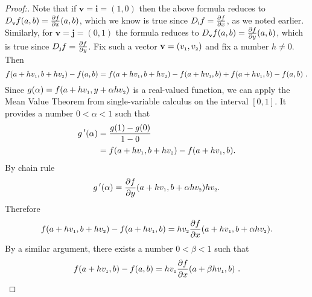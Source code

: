 \begin{proofbar}
\begin{proof}[Proof:]
 Note that if $\textbf{v} = \textbf{i} = (1,0)$ then the above formula reduces to
 $D_{\scriptscriptstyle \textbf{v}}f(a,b) = \tfrac{\partial f}{\partial x}(a,b)$, which we know is true since
 $D_{\scriptscriptstyle \textbf{i}}f = \tfrac{\partial f}{\partial x}$, as we noted earlier. Similarly, for
 $\textbf{v} = \textbf{j} = (0,1)$ the formula reduces to $D_{\scriptscriptstyle \textbf{v}}f(a,b) =
 \tfrac{\partial f}{\partial y}(a,b)$, which is true since $D_{\scriptscriptstyle \textbf{j}}f = \tfrac{\partial f}{\partial y}$.
 Fix such a vector $\textbf{v} = (v_{\scriptscriptstyle 1},v_{\scriptscriptstyle 2})$ and fix a number $h \ne 0$.
Then
 \begin{equation}\label{eqn:dirderivdiff}
  f(a+hv_{\scriptscriptstyle 1},b+hv_{\scriptscriptstyle 2}) - f(a,b) = f(a+hv_{\scriptscriptstyle 1},b+hv_{\scriptscriptstyle 2}) - f(a+hv_{\scriptscriptstyle 1},b) +
   f(a+hv_{\scriptscriptstyle 1},b) - f(a,b) ~.
 \end{equation}
 Since $g(\alpha)=f(a+hv_{\scriptscriptstyle 1},y+\alpha hv_{\scriptscriptstyle 2})$ is a real-valued function,
 we can apply
 the Mean Value Theorem from single-variable calculus on the interval $[0,1]$.
 It provides a number $0 < \alpha < 1$ such that
 \begin{align*}
  g\,'(\alpha) 
  &= 
   \frac{g(1) - g(0)}{1-0} 
   \\
   &=
   f(a+hv_{\scriptscriptstyle 1},b+hv_{\scriptscriptstyle 2}) - f(a+hv_{\scriptscriptstyle 1},b).
 \end{align*}
 By chain rule
 \[g\,'(\alpha)=\frac{\partial f}{\partial y}(a+hv_{\scriptscriptstyle 1},b+\alpha hv_{\scriptscriptstyle 2}) hv_{\scriptscriptstyle 2}.\]
 Therefore 
 \[f(a+hv_{\scriptscriptstyle 1},b+hv_{\scriptscriptstyle 2}) - f(a+hv_{\scriptscriptstyle 1},b)
 =
 hv_{\scriptscriptstyle 2}\frac{\partial f}{\partial x}(a+hv_{\scriptscriptstyle 1},b+\alpha hv_{\scriptscriptstyle 2}) .\]
 By a similar argument, there exists a number $0 < \beta < 1$ such that
 \begin{displaymath}
  f(a+hv_{\scriptscriptstyle 1},b) - f(a,b) = hv_{\scriptscriptstyle 1} \frac{\partial f}{\partial x}(a+\beta hv_{\scriptscriptstyle 1},b) ~.
 \end{displaymath}

\end{proof}
\end{proofbar}
